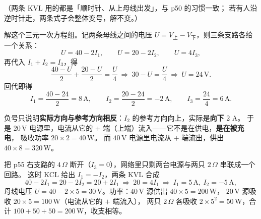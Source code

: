 \documentclass[11pt]{ctexart}
\begin{document}
（两条 KVL 用的都是「顺时针、从上母线出发」，与 p50 的习惯一致；
若有人沿逆时针走，两条式子会整体变号，解不变。）


解这个三元一次方程组。记两条母线之间的电压 $U=V_{\text{上}}-V_{\text{下}}$，则三条支路各给一个关系：
\[
U=40-2I_1,\qquad U=20-2I_2,\qquad U=4I_3 ,
\]
再代入 $I_1+I_2=I_3$，得
\[
\frac{40-U}{2}+\frac{20-U}{2}=\frac{U}{4}
\ \Longrightarrow\ 30-U=\frac{U}{4}
\ \Longrightarrow\ U=24\,\mathrm{V}.
\]
回代即得
\[
I_1=\frac{40-24}{2}=8\,\mathrm{A},\qquad
I_2=\frac{20-24}{2}=-2\,\mathrm{A},\qquad
I_3=\frac{24}{4}=6\,\mathrm{A}.
\]


负号只说明\textbf{实际方向与参考方向相反}：$I_2$ 的参考方向向上，实际是\textbf{向下} 2 A。
于是 $20\,\mathrm{V}$ 电源里，电流从它的 $+$ 端（上端）流入——它不是在供电，\textbf{是在被充电}，
吸收功率 $20\times2=40\,\mathrm{W}$。
而 $40\,\mathrm{V}$ 电源里电流从 $+$ 端流出，供出 $40\times8=320\,\mathrm{W}$。




把 p55 右支路的 $4\,\Omega$ 断开（$I_3=0$），网络里只剩两台电源与两只 $2\,\Omega$ 串联成一个回路。
这时 KCL 给出 $I_1=-I_2$，两条 KVL 合成
\[ 40-2I_1=20-2I_2=20+2I_1
\ \Longrightarrow\ 20=4I_1
\ \Longrightarrow\ I_1=5\,\mathrm{A},\ I_2=-5\,\mathrm{A}, \]
母线电压 $U=40-2\times5=30\,\mathrm{V}$。功率：$40\,\mathrm{V}$ 源供出 $40\times5=200\,\mathrm{W}$，
$20\,\mathrm{V}$ 源吸收 $20\times5=100\,\mathrm{W}$（电流从它的 $+$ 端流入），
两只 $2\,\Omega$ 各吸收 $2\times5^2=50\,\mathrm{W}$，合计 $100+50+50=200\,\mathrm{W}$，收支相等。
\end{document}

